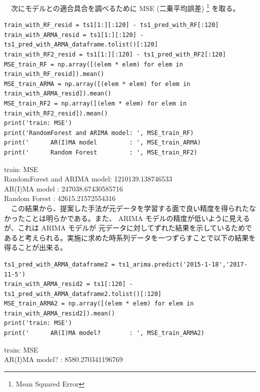 \documentclass{scrartcl}
\begin{document}
　次にモデルとの適合具合を調べるために MSE (二乗平均誤差) \footnote{Mean Squared Error} を取る。\\
\begin{verbatim}
train_with_RF_resid = ts1[1:][:120] - ts1_pred_with_RF[:120]
train_with_ARMA_resid = ts1[1:][:120] - ts1_pred_with_ARMA_dataframe.tolist()[:120]
train_with_RF2_resid = ts1[1:][:120] - ts1_pred_with_RF2[:120]
MSE_train_RF = np.array([(elem * elem) for elem in train_with_RF_resid]).mean()
MSE_train_ARMA = np.array([(elem * elem) for elem in train_with_ARMA_resid]).mean()
MSE_train_RF2 = np.array([(elem * elem) for elem in train_with_RF2_resid]).mean()
print('train: MSE')
print('RandomForest and ARIMA model: ', MSE_train_RF)
print('      AR(I)MA model         : ', MSE_train_ARMA)
print('      Random Forest         : ', MSE_train_RF2)
\end{verbatim}

train: MSE\\
RandomForest and ARIMA model:  1210139.138746533\\
      AR(I)MA model         :  247038.67430585716\\
      Random Forest         :  42615.21572554316\\

　この結果から、提案した手法が元データを学習する面で良い精度を得られたなかったことは明らかである。また、 ARIMA モデルの精度が低いように見えるが、これは ARIMA モデルが 元データに対してずれた結果を示しているためであると考えられる。実施に求めた時系列データを一つずらすことで以下の結果を得ることが出来る。\\

\begin{verbatim}
ts1_pred_with_ARMA_dataframe2 = ts1_arima.predict('2015-1-18','2017-11-5')
train_with_ARMA_resid2 = ts1[:120] - ts1_pred_with_ARMA_dataframe2.tolist()[:120]
MSE_train_ARMA2 = np.array([(elem * elem) for elem in train_with_ARMA_resid2]).mean()
print('train: MSE')
print('      AR(I)MA model?        : ', MSE_train_ARMA2)
\end{verbatim}

train: MSE\\
      AR(I)MA model?        :  8580.270341196769\\
\end{document}
